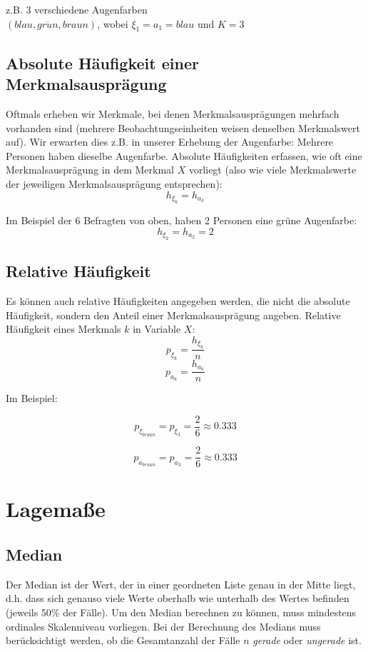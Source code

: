 \documentclass[11pt,a4paper]{article}
\begin{document}
z.B. 3 verschiedene Augenfarben \\
$(blau, gr\ddot{u}n, braun)$, wobei $\xi_1 = a_1 = blau$ und $K=3$\\

\subsection{Absolute Häufigkeit einer Merkmalsausprägung}
Oftmals erheben wir Merkmale, bei denen Merkmalsausprägungen mehrfach vorhanden sind (mehrere Beobachtungseinheiten weisen denselben Merkmalswert auf). Wir erwarten dies z.B. in unserer Erhebung der Augenfarbe: Mehrere Personen haben dieselbe Augenfarbe. Absolute Häufigkeiten erfassen, wie oft eine Merkmalsausprägung in dem Merkmal $X$ vorliegt (also wie viele Merkmalswerte der jeweiligen Merkmalsausprägung entsprechen):\\

$$h_{\xi_k} = h_{a_k}$$

Im Beispiel der 6 Befragten von oben, haben 2 Personen eine grüne Augenfarbe: \\

$$h_{\xi_2} = h_{a_2} = 2$$

\subsection{Relative Häufigkeit}
Es können auch relative Häufigkeiten angegeben werden, die nicht die absolute Häufigkeit, sondern den Anteil einer Merkmalsausprägung angeben.
Relative Häufigkeit eines Merkmals $k$ in Variable $X$:\\
$$p_{\xi_k} = \frac{h_{\xi_k}}{n}$$
$$p_{a_k} = \frac{h_{a_k}}{n}$$

Im Beispiel: 

$$p_{\xi_{braun}}=p_{\xi_3}=\frac{2}{6} \approx 0.333$$

$$p_{a_{braun}}=p_{a_3}=\frac{2}{6} \approx 0.333$$

\section{Lagemaße}
\subsection{Median}
Der Median ist der Wert, der in einer geordneten Liste genau in der Mitte liegt, d.h. dass sich genauso viele Werte oberhalb wie unterhalb des Wertes befinden (jeweils 50\% der Fälle). Um den Median berechnen zu können, muss mindestens ordinales Skalenniveau vorliegen. Bei der Berechnung des Medians muss berücksichtigt werden, ob die Gesamtanzahl der Fälle $n$ \textit{gerade} oder \textit{ungerade} ist.\\
\end{document}
